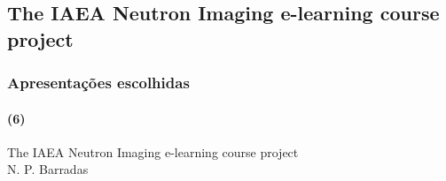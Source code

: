 \documentclass[svgnames,smaller,table]{beamer}
\begin{document}
\subsection{The IAEA Neutron Imaging e-learning course project}
\begin{frame}
  \frametitle{Apresentações escolhidas}
  \framesubtitle{(6)}
  \begin{center}
    The IAEA Neutron Imaging e-learning course project\\
    \vspace{2.0cm}
    N. P. Barradas
  \end{center}
\end{frame}

\begin{frame}
  
\end{frame}
\begin{frame}
  
\end{frame}
\begin{frame}
  
\end{frame}
\begin{frame}
  
\end{frame}
\begin{frame}
  
\end{frame}


\end{document}
